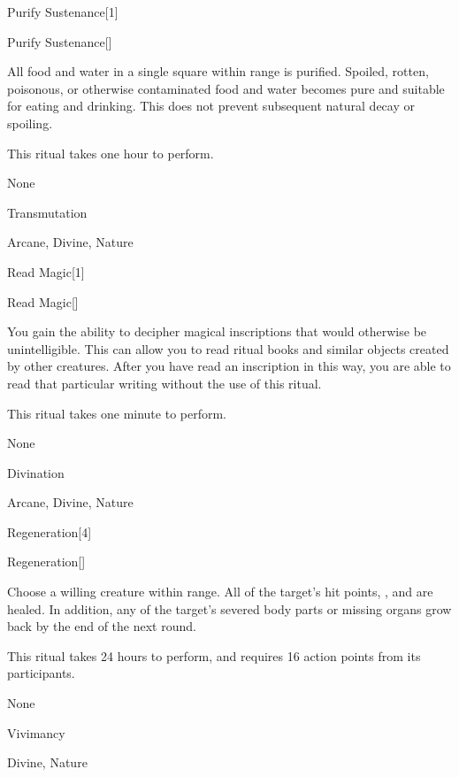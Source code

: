 \begin{spellsection}{Purify Sustenance}[1]


\begin{ability}{Purify Sustenance}[]

All food and water in a single square within \rngclose range is purified.
Spoiled, rotten, poisonous, or otherwise contaminated food and water becomes pure and suitable for eating and drinking.
This does not prevent subsequent natural decay or spoiling.

This ritual takes one hour to perform.

\end{ability}


 None

 Transmutation

 Arcane, Divine, Nature
\end{spellsection}


\begin{spellsection}{Read Magic}[1]


\begin{ability}{Read Magic}[]

You gain the ability to decipher magical inscriptions that would otherwise be unintelligible.
This can allow you to read ritual books and similar objects created by other creatures.
After you have read an inscription in this way, you are able to read that particular writing without the use of this ritual.

This ritual takes one minute to perform.

\end{ability}


 None

 Divination

 Arcane, Divine, Nature
\end{spellsection}


\begin{spellsection}{Regeneration}[4]


\begin{ability}{Regeneration}[]

Choose a willing creature within \rngclose range.
All of the target's hit points, , and  are healed.
In addition, any of the target's severed body parts or missing organs grow back by the end of the next round.

This ritual takes 24 hours to perform, and requires 16 action points from its participants.

\end{ability}


 None

 Vivimancy

 Divine, Nature
\end{spellsection}


